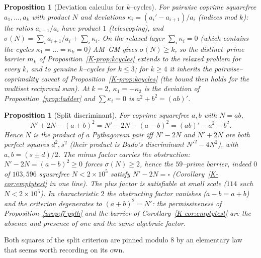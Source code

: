 \documentclass[11pt]{article}
\newtheorem{proposition}[theorem]{Proposition}
\theoremstyle{definition}
\begin{document}
\begin{proposition}[Deviation calculus for $k$--cycles]\label{prop:kdev}
For pairwise coprime squarefree $a_1,\dots,a_k$ with product $N$ and deviations
$\kappa_i=(a_i'-a_{i+1})/a_i$ (indices mod $k$): the ratios $a_{i+1}/a_i$ have product $1$
(telescoping), and $\sigma(N)=\sum_i a_{i+1}/a_i+\sum_i\kappa_i$. On the relaxed layer
$\sum_i\kappa_i=0$ (which contains the cycles $\kappa_1=\dots=\kappa_k=0$) AM--GM gives
$\sigma(N)\ge k$, so the distinct--prime barrier $m_k$ of Proposition~\ref{K-prop:kcycles} extends to the
relaxed problem for every $k$, and to genuine $k$--cycles for $k\le3$; for $k\ge4$ it inherits the
pairwise--coprimality caveat of Proposition~\ref{K-prop:kcycles} (the bound then holds for the multiset
reciprocal sum). At $k=2$, $\kappa_1=-\kappa_2$ is the deviation of Proposition~\ref{prop:ladder} and
$\sum\kappa_i=0$ is $a^2+b^2=(ab)'$.
\end{proposition}

\begin{proposition}[Split discriminant]\label{prop:splitdisc}
For coprime squarefree $a,b$ with $N=ab$,
\[ N'+2N-(a+b)^2=N'-2N-(a-b)^2=(ab)'-a^2-b^2. \]
Hence $N$ is the product of a Pythagorean pair iff $N'-2N$ and $N'+2N$ are \emph{both} perfect squares
$d^2,s^2$ (their product is Bado's discriminant $N'^2-4N^2$), with $a,b=(s\pm d)/2$. The minus factor
carries the obstruction: $N'-2N=(a-b)^2\ge0$ forces $\sigma(N)\ge2$, hence the $59$--prime barrier,
indeed $0$ of $103{,}596$ squarefree $N<2\times10^5$ satisfy $N'-2N=\square$
(Corollary~\ref{K-cor:emptytest} in one line). The plus factor is satisfiable at small scale ($114$ such
$N<2\times10^5$). In characteristic $2$ the obstructing factor vanishes ($a-b=a+b$) and the criterion
degenerates to $(a+b)^2=N'$: the permissiveness of Proposition~\ref{prop:ff-pyth} and the barrier of
Corollary~\ref{K-cor:emptytest} are the absence and presence of one and the same algebraic factor.
\end{proposition}

Both squares of the split criterion are pinned modulo $8$ by an elementary law that seems worth
recording on its own.
\end{document}
